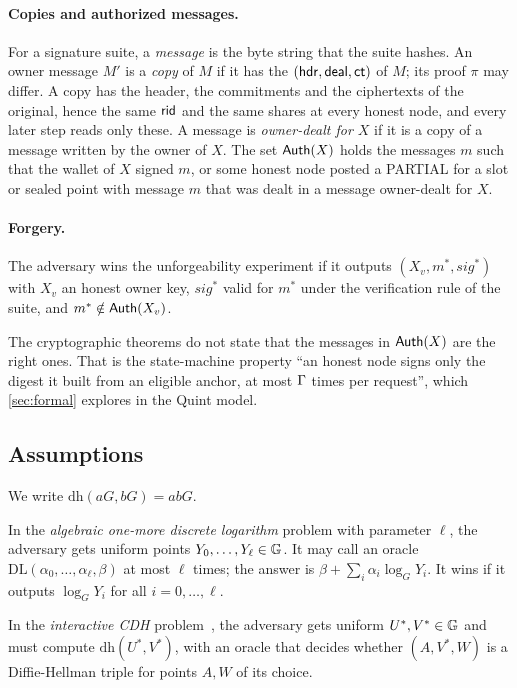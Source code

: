 \paragraph{Copies and authorized messages.} For a signature suite, a \emph{message} is the byte string that the suite hashes. An owner message $M'$ is a \emph{copy} of $M$ if it has the $(\mathsf{hdr}, \mathsf{deal}, \mathsf{ct})$ of $M$; its proof $\pi$ may differ. A copy has the header, the commitments and the ciphertexts of the original, hence the same $\mathsf{rid}$ and the same shares at every honest node, and every later step reads only these. A message is \emph{owner-dealt for $X$} if it is a copy of a message written by the owner of $X$. The set $\mathsf{Auth}(X)$ holds the messages $m$ such that the wallet of $X$ signed $m$, or some honest node posted a PARTIAL for a slot or sealed point with message $m$ that was dealt in a message owner-dealt for $X$.

\paragraph{Forgery.} The adversary wins the unforgeability experiment if it outputs $(X_v, m^*, sig^*)$ with $X_v$ an honest owner key, $sig^*$ valid for $m^*$ under the verification rule of the suite, and $m^* \notin \mathsf{Auth}(X_v)$.

The cryptographic theorems do not state that the messages in $\mathsf{Auth}(X)$ are the right ones. That is the state-machine property ``an honest node signs only the digest it built from an eligible anchor, at most $\Gamma$ times per request'', which \cref{sec:formal} explores in the Quint model.

\subsection{Assumptions}\label{sec:assumptions}

We write $\mathrm{dh}(aG, bG) = abG$.

\begin{definition}[AOMDL]
In the \emph{algebraic one-more discrete logarithm} problem with parameter $\ell$, the adversary gets uniform points $Y_0, \dots, Y_\ell \in \mathbb{G}$. It may call an oracle $\mathrm{DL}(\alpha_0, \dots, \alpha_\ell, \beta)$ at most $\ell$ times; the answer is $\beta + \sum_i \alpha_i \log_G Y_i$. It wins if it outputs $\log_G Y_i$ for all $i = 0, \dots, \ell$.
\end{definition}

\begin{definition}[ICDH]
In the \emph{interactive CDH} problem~\cite[p.~29]{GS22}, the adversary gets uniform $U^*, V^* \in \mathbb{G}$ and must compute $\mathrm{dh}(U^*, V^*)$, with an oracle that decides whether $(A, V^*, W)$ is a Diffie-Hellman triple for points $A, W$ of its choice.
\end{definition}


